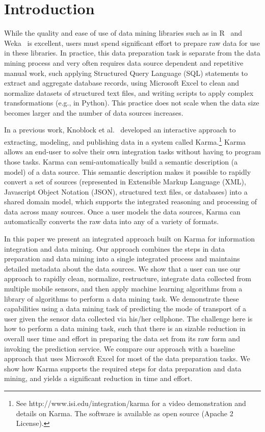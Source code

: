 \section{Introduction}
While the quality and ease of use of data mining libraries such as in R~\cite{R2008} and Weka~\cite{Hall2009} is excellent, users must spend significant effort to prepare raw data for use in these libraries. In practice, this data preparation task is separate from the data mining process and very often requires data source dependent and repetitive manual work, such applying Structured Query Language (SQL) statements to extract and aggregate database records, using Microsoft Excel to clean and normalize datasets of structured text files, and writing scripts to apply complex transformations (e.g., in Python). This practice does not scale when the data size becomes larger and the number of data sources increases.

In a previous work, Knoblock et al.~\cite{knoblock11:lisc,knoblock12:eswc} developed an interactive approach to extracting, modeling, and publishing data in a system called Karma.\footnote{See http://www.isi.edu/integration/karma for a video demonstration and details on Karma. The software is available as open source (Apache 2 License).} Karma allows an end-user to solve their own integration tasks without having to program those tasks. Karma can semi-automatically build a semantic description (a model) of a data source. This semantic description makes it possible to rapidly convert a set of sources (represented in Extensible Markup Language (XML), Javascript Object Notation (JSON), structured text files, or databases) into a shared domain model, which supports the integrated reasoning and processing of data across many sources. Once a user models the data sources, Karma can automatically converts the raw data into any of a variety of formats.

In this paper we present an integrated approach built on Karma for information integration and data mining. Our approach combines the steps in data preparation and data mining into a single integrated process and maintains detailed metadata about the data sources. We show that a user can use our approach to rapidly clean, normalize, restructure, integrate data collected from multiple mobile sensors, and then apply machine learning algorithms from a library of algorithms to perform a data mining task. We demonstrate these capabilities using a data mining task of predicting the mode of transport of a user given the sensor data collected via his/her cellphone. The challenge here is how to perform a data mining task, such that there is an sizable reduction in overall user time and effort in preparing the data set from its raw form and invoking the prediction service. We compare our approach with a baseline approach that uses Microsoft Excel for most of the data preparation tasks. We show how Karma supports the required steps for data preparation and data mining, and yields a significant reduction in time and effort.

